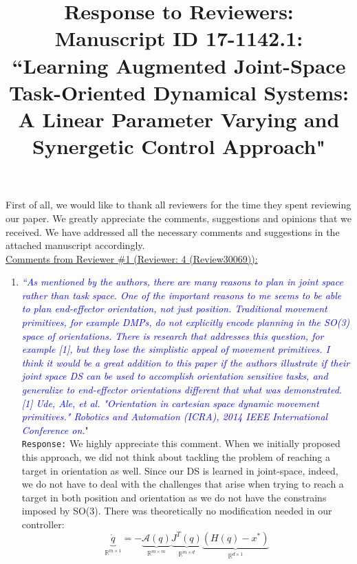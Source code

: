 \documentclass{article}
\title{Response to Reviewers: Manuscript ID 17-1142.1: ``Learning Augmented Joint-Space Task-Oriented Dynamical Systems: A Linear Parameter Varying and Synergetic Control Approach"}
\begin{document}
\maketitle
\small
First of all, we would like to thank all reviewers for the time they spent reviewing our paper. We greatly appreciate the comments, suggestions and opinions that we received. We have addressed all the necessary comments and suggestions in the attached manuscript accordingly.\\

\noindent \underline{Comments from Reviewer \#1 (Reviewer: 4 (Review30069)):}
\begin{enumerate}
\item \textcolor{blue}{\textit{``As mentioned by the authors, there are many reasons to plan in joint space rather than task space. One of the important reasons to me seems to be able to plan end-effector orientation, not just position. Traditional movement primitives, for example DMPs, do not explicitly encode planning in the SO(3) space of orientations. There is research that addresses this question, for example [1], but they lose the simplistic appeal of movement primitives. I think it would be a great addition to this paper if the authors illustrate if their joint space DS can be used to accomplish orientation sensitive tasks, and generalize to end-effector orientations different that what was demonstrated.[1] Ude, Ale, et al. "Orientation in cartesian space dynamic movement primitives." Robotics and Automation (ICRA), 2014 IEEE International Conference on.}}"\\
\texttt{Response:}  We highly appreciate this comment. When we initially proposed this approach, we did not think about tackling the problem of reaching a target in orientation as well. Since our DS is learned in joint-space, indeed, we do not have to deal with the challenges that arise when trying to reach a target in both position and orientation as we do not have the constrains imposed by SO(3). There was theoretically no modification needed in our controller:
\begin{equation}
\underbrace{\dot{q}}_{\mathbb{R}^{m\times 1}} = -\underbrace{\mathcal{A}(q)}_{\mathbb{R}^{m\times m}}\underbrace{J^{T}(q)}_{\mathbb{R}^{m\times d}}\underbrace{(H(q)-x^*)}_{\mathbb{R}^{d\times 1}}
\label{eq:jtds}
\end{equation}

\end{enumerate}
\end{document}
